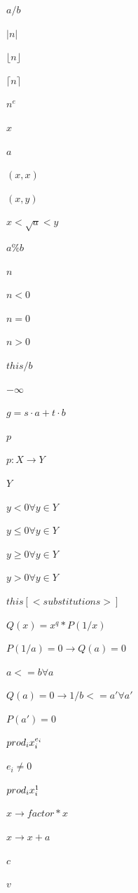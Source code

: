 \documentclass{article}
\begin{document}
$ a / b $
\pagebreak

$|n|$
\pagebreak

$\lfloor n \rfloor$
\pagebreak

$\lceil n \rceil$
\pagebreak

$n^e$
\pagebreak

$x$
\pagebreak

$a$
\pagebreak

$(x,x)$
\pagebreak

$(x,y)$
\pagebreak

$ x < \sqrt{a} < y $
\pagebreak

$a \% b$
\pagebreak

$n$
\pagebreak

$n < 0$
\pagebreak

$n = 0$
\pagebreak

$n > 0$
\pagebreak

$ this / b $
\pagebreak

$-\infty$
\pagebreak

$g = s \cdot a + t \cdot b$
\pagebreak

$p$
\pagebreak

$p: X \rightarrow Y$
\pagebreak

$Y$
\pagebreak

$y < 0 \forall y \in Y$
\pagebreak

$y \leq 0 \forall y \in Y$
\pagebreak

$y \geq 0 \forall y \in Y$
\pagebreak

$y > 0 \forall y \in Y$
\pagebreak

$ this[<substitutions>] $
\pagebreak

$Q(x) = x^q*P(1/x)$
\pagebreak

$P(1/a) = 0 \rightarrow Q(a) = 0$
\pagebreak

$a <= b \forall a$
\pagebreak

$Q(a) = 0 \rightarrow 1/b <= a' \forall a'$
\pagebreak

$P(a') = 0$
\pagebreak

$ \\prod_i x_i^{e_i}$
\pagebreak

$e_i \neq 0 $
\pagebreak

$ \\prod_i x_i^1 $
\pagebreak

$ x \rightarrow factor * x $
\pagebreak

$ x \rightarrow x + a $
\pagebreak

$ c $
\pagebreak

$ v $
\pagebreak
\end{document}
